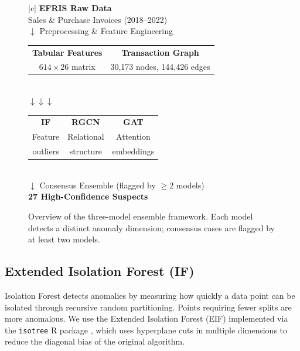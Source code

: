 \documentclass[10pt,twocolumn]{article}
\begin{document}
\begin{figure}[htb]
  \centering
  \small
  \renewcommand{\arraystretch}{1.3}
  \begin{tabular}{|c|}
    \hline
    \textbf{EFRIS Raw Data}\\
    Sales \& Purchase Invoices (2018--2022)\\
    \hline
    $\downarrow$ Preprocessing \& Feature Engineering\\
    \hline
    \begin{tabular}{c@{\quad}c}
      \textbf{Tabular Features} & \textbf{Transaction Graph}\\
      $614 \times 26$ matrix & 30,173 nodes, 144,426 edges
    \end{tabular}\\
    \hline
    $\downarrow$\quad\quad\quad\quad$\downarrow$\quad\quad\quad\quad$\downarrow$\\
    \hline
    \begin{tabular}{c@{\;\;}c@{\;\;}c}
      \textbf{IF} & \textbf{RGCN} & \textbf{GAT}\\
      Feature & Relational & Attention\\
      outliers & structure & embeddings
    \end{tabular}\\
    \hline
    $\downarrow$ Consensus Ensemble (flagged by $\geq 2$ models)\\
    \hline
    \textbf{27 High-Confidence Suspects}\\
    \hline
  \end{tabular}
  \caption{Overview of the three-model ensemble framework. Each model detects
           a distinct anomaly dimension; consensus cases are flagged by at least
           two models.}
  \label{fig:pipeline}
\end{figure}

\subsection{Extended Isolation Forest (IF)}

Isolation Forest \cite{liu2008isolation} detects anomalies by measuring how
quickly a data point can be isolated through recursive random partitioning.
Points requiring fewer splits are more anomalous. We use the Extended Isolation
Forest (EIF) \cite{hariri2019extended} implemented via the \texttt{isotree}
R package \cite{cortes2021isotree}, which uses hyperplane cuts in multiple
dimensions to reduce the diagonal bias of the original algorithm.
\end{document}
